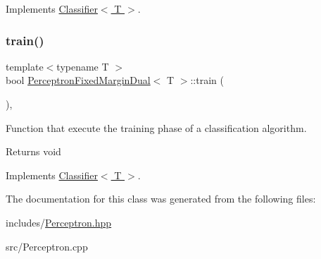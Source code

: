Implements \hyperlink{class_classifier_ab3b9544a8d9c3cbde8d5865c7e9be0fb}{Classifier$<$ T $>$}.

\mbox{\label{class_perceptron_fixed_margin_dual_a58a5acdd6afaedff53fab23779f01486}} 
\subsubsection{\texorpdfstring{train()}{train()}}
{\footnotesize\ttfamily template$<$typename T $>$ \\
bool \hyperlink{class_perceptron_fixed_margin_dual}{Perceptron\+Fixed\+Margin\+Dual}$<$ T $>$\+::train (\begin{DoxyParamCaption}{ }\end{DoxyParamCaption})\hspace{0.3cm}{\ttfamily [override]}, {\ttfamily [virtual]}}



Function that execute the training phase of a classification algorithm. 

\begin{DoxyReturn}{Returns}
void 
\end{DoxyReturn}


Implements \hyperlink{class_classifier_a120849bfdfa3ba7a0388b32b2d76bf4f}{Classifier$<$ T $>$}.



The documentation for this class was generated from the following files\+:\begin{DoxyCompactItemize}
\item 
includes/\hyperlink{_perceptron_8hpp}{Perceptron.\+hpp}\item 
src/Perceptron.\+cpp\end{DoxyCompactItemize}
